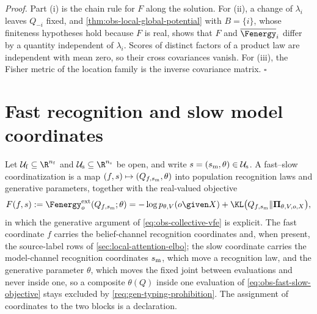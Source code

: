 \noindent\emph{Proof.}
Part (i) is the chain rule for $F$ along the solution. For (ii), a change of
$\lambda_i$ leaves $Q_{-i}$ fixed, and \cref{thm:obs-local-global-potential} with
$B=\{i\}$, whose finiteness hypotheses hold because $F$ is real, shows that $F$
and $\overline\Fenergy_i$ differ by a quantity independent of $\lambda_i$. Scores
of distinct factors of a product law are independent with mean zero, so their
cross covariances vanish. For (iii), the Fisher metric of the location family is
the inverse covariance matrix. $\square$

\section{Fast recognition and slow model coordinates}
\label{sec:obs-fast-slow}

Let $\mathcal U_{\rm f}\subseteq\R^{n_{\rm f}}$ and
$\mathcal U_{\rm s}\subseteq\R^{n_{\rm s}}$ be open, and write
$s=(s_{\rm m},\theta)\in\mathcal U_{\rm s}$. A fast--slow coordinatization is a
map $(f,s)\mapsto(Q_{f,s_{\rm m}},\theta)$ into population recognition laws and
generative parameters, together with the real-valued objective
\begin{equation}
F(f,s):=\Fenergy^{\mathrm{ext}}_o(Q_{f,s_{\rm m}};\theta)
=-\log p_{\theta,V}(o\given X)
+\KL\bigl(Q_{f,s_{\rm m}}\Vert\boldsymbol\Pi_{\theta,V,o,X}\bigr),
\label{eq:obs-fast-slow-objective}
\end{equation}
in which the generative argument of \eqref{eq:obs-collective-vfe} is explicit. The
fast coordinate $f$ carries the belief-channel recognition coordinates and, when
present, the source-label rows of \cref{sec:local-attention-elbo}; the slow
coordinate carries the model-channel recognition coordinates $s_{\rm m}$, which move
a recognition law, and the generative parameter $\theta$, which moves the fixed joint
between evaluations and never inside one, so a composite $\theta(Q)$ inside one
evaluation of \eqref{eq:obs-fast-slow-objective} stays excluded by
\cref{req:gen-typing-prohibition}. The assignment of coordinates to the two blocks is
a declaration.

